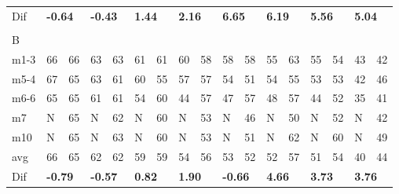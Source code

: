 \begin{table}[H]
\begin{tabular}{l|l|l|l|l|l|l|l|l|l|l|l|l|l|l|l|l}
Dif & \multicolumn{2}{l|}{\textbf{-0.64}} & \multicolumn{2}{l|}{\textbf{-0.43}} & \multicolumn{2}{l|}{\textbf{1.44}} & \multicolumn{2}{l|}{\textbf{2.16}} & \multicolumn{2}{l|}{\textbf{6.65}} & \multicolumn{2}{l|}{\textbf{6.19}}& \multicolumn{2}{l|}{\textbf{5.56}}& \multicolumn{2}{l}{\textbf{5.04}} \\
\multicolumn{17}{l}{ } \\   
B & \multicolumn{2}{l|}{} & \multicolumn{2}{l|}{} & \multicolumn{2}{l|}{} & \multicolumn{2}{l|}{} & \multicolumn{2}{l|}{} & \multicolumn{2}{l|}{}& \multicolumn{2}{l|}{}& \multicolumn{2}{l}{}     \\ \hline
m1-3   &    66    &    66    &   63    &   63       &    61   &   61    &   60     &   58     &    58   &    58     &    55   &     63     &      55   &    54    &  43 &  42  \\
m5-4   &    67    &    65    &   63    &  61        &    60   &  55     &   57     &    57    &  54     &     51    &   54    &     55     &     53    &    53    &  42 &  46  \\
m6-6   &   65     &   65     &   61    &  61        &   54    &   60    &    44    &    57    &   47    &     57    &     48  &    57      &     44    &   52     &  35 &  41  \\
m7      &   N       &      65  &    N    &     62     &    N     &   60    &   N      &    53    &   N     &      46   &   N      &      50    &     N     &     52   &   N  &   42 \\
m10    &   N       &    65    &    N    &     63     &    N     &   60    &   N      &    53    &   N     &     51    &     N    &     62     &     N     &     60   &    N  &  49  \\ \hline
avg     &     66    &     65   &    62   &     62     &     59  &   59    &   54     &   56     &     53  &  52       &     52   &    57     &       51  &   54     & 40   & 44\\ \hline
Dif & \multicolumn{2}{l|}{\textbf{-0.79}} & \multicolumn{2}{l|}{\textbf{-0.57}} & \multicolumn{2}{l|}{\textbf{0.82}} & \multicolumn{2}{l|}{\textbf{1.90}} & \multicolumn{2}{l|}{\textbf{-0.66}} & \multicolumn{2}{l|}{\textbf{4.66}}& \multicolumn{2}{l|}{\textbf{3.73}}& \multicolumn{2}{l}{\textbf{3.76}}       
\end{tabular}
\label{ta:meas:approved_data_par}
\end{table}


